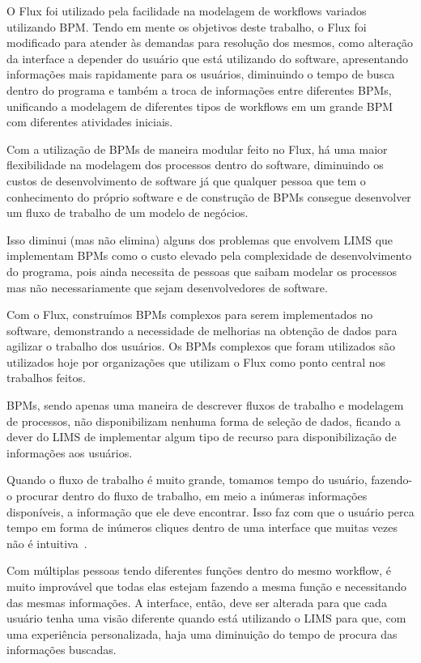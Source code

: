 O Flux foi utilizado pela facilidade na modelagem de workflows variados utilizando BPM. Tendo em mente os objetivos deste trabalho, o Flux foi modificado para atender às demandas para resolução dos mesmos, como alteração da interface a depender do usuário que está utilizando do software, apresentando informações mais rapidamente para os usuários, diminuindo o tempo de busca dentro do programa e também a troca de informações entre diferentes BPMs, unificando a modelagem de diferentes tipos de workflows em um grande BPM com diferentes atividades iniciais.


Com a utilização de BPMs de maneira modular feito no Flux, há uma maior flexibilidade na modelagem dos processos dentro do software, diminuindo os custos de desenvolvimento de software já que qualquer pessoa que tem o conhecimento do próprio software e de construção de BPMs consegue desenvolver um fluxo de trabalho de um modelo de negócios.

Isso diminui (mas não elimina) alguns dos problemas que envolvem LIMS que implementam BPMs como o custo elevado pela complexidade de desenvolvimento do programa, pois ainda necessita de pessoas que saibam modelar os processos mas não necessariamente que sejam desenvolvedores de software.


Com o Flux, construímos BPMs complexos para serem implementados no software, demonstrando a necessidade de melhorias na obtenção de dados para agilizar o trabalho dos usuários. Os BPMs complexos que foram utilizados são utilizados hoje por organizações que utilizam o Flux como ponto central nos trabalhos feitos.

BPMs, sendo apenas uma maneira de descrever fluxos de trabalho e modelagem de processos, não disponibilizam nenhuma forma de seleção de dados, ficando a dever do LIMS de implementar algum tipo de recurso para disponibilização de informações aos usuários.

Quando o fluxo de trabalho é muito grande, tomamos tempo do usuário, fazendo-o procurar dentro do fluxo de trabalho, em meio a inúmeras informações disponíveis, a informação que ele deve encontrar. Isso faz com que o usuário perca tempo em forma de inúmeros cliques dentro de uma interface que muitas vezes não é intuitiva~\cite{OvationIncNeeded:LIMS}.

Com múltiplas pessoas tendo diferentes funções dentro do mesmo workflow, é muito improvável que todas elas estejam fazendo a mesma função e necessitando das mesmas informações. A interface, então, deve ser alterada para que cada usuário tenha uma visão diferente quando está utilizando o LIMS para que, com uma experiência personalizada, haja uma diminuição do tempo de procura das informações buscadas.

